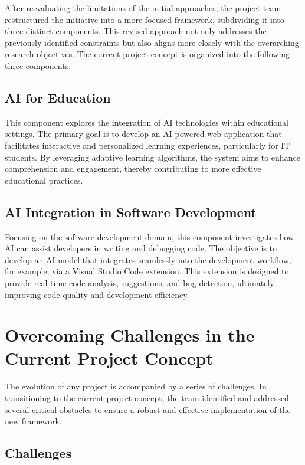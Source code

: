 After reevaluating the limitations of the initial approaches, the project team restructured the initiative into a more focused framework, subdividing it into three distinct components. This revised approach not only addresses the previously identified constraints but also aligns more closely with the overarching research objectives. The current project concept is organized into the following three components:

\subsection{AI for Education}

This component explores the integration of AI technologies within educational settings. The primary goal is to develop an AI-powered web application that facilitates interactive and personalized learning experiences, particularly for IT students. By leveraging adaptive learning algorithms, the system aims to enhance comprehension and engagement, thereby contributing to more effective educational practices.

\subsection{AI Integration in Software Development}

Focusing on the software development domain, this component investigates how AI can assist developers in writing and debugging code. The objective is to develop an AI model that integrates seamlessly into the development workflow, for example, via a Visual Studio Code extension. This extension is designed to provide real-time code analysis, suggestions, and bug detection, ultimately improving code quality and development efficiency.



\section{Overcoming Challenges in the Current Project Concept}

The evolution of any project is accompanied by a series of challenges. In transitioning to the current project concept, the team identified and addressed several critical obstacles to ensure a robust and effective implementation of the new framework.

\subsection{Challenges}


